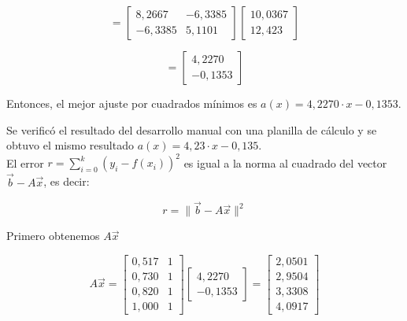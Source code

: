 \begin{equation}
    =
    \begin{bmatrix}
        8{,}2667 & -6{,}3385 \\
        -6{,}3385 & 5{,}1101
    \end{bmatrix}
    \begin{bmatrix}
        10{,}0367 \\
        12{,}423
    \end{bmatrix}
    \label{eq:cuadrados-minimos-solucion-3}
\end{equation}

\begin{equation}
    =
    \begin{bmatrix}
        4{,}2270 \\
        -0{,}1353
    \end{bmatrix}
    \label{eq:cuadrados-minimos-solucion-4}
\end{equation}

Entonces, el mejor ajuste por cuadrados mínimos es $a(x) = 4{,}2270 \cdot x -0{,}1353$.

Se verificó el resultado del desarrollo manual con una planilla de cálculo y se obtuvo el mismo resultado $a(x) = 4{,}23 \cdot x -0{,}135$.\\

El error $r = \sum_{i=0}^{k} (y_i - f(x_i))^2$ es igual a la norma al cuadrado del vector $\vec{b} - A\vec{x}$, es decir:

\begin{equation}
    r = \|\vec{b} - A\vec{x}\|^2
    \label{eq:error-cuadrados-minimos}
\end{equation}

Primero obtenemos $A\vec{x}$

\begin{equation}
    A\vec{x} =
    \begin{bmatrix}
        0{,}517 & 1 \\
        0{,}730 & 1 \\
        0{,}820 & 1 \\
        1{,}000 & 1
    \end{bmatrix}
    \begin{bmatrix}
        4{,}2270 \\
        -0{,}1353
    \end{bmatrix}
    =
    \begin{bmatrix}
        2{,}0501 \\
        2{,}9504 \\
        3{,}3308 \\
        4{,}0917
    \end{bmatrix}
    \label{eq:error-cuadrados-minimos-Ax}
\end{equation}

